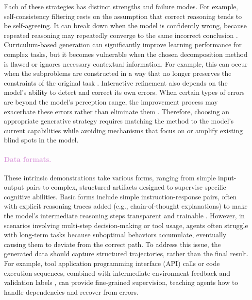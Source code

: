 Each of these strategies has distinct strengths and failure modes. For example, self-consistency filtering rests on the assumption that correct reasoning tends to be self-agreeing. It can break down when the model is confidently wrong, because repeated reasoning may repeatedly converge to the same incorrect conclusion \citep{chen2024failuresselfconsistencymultistepreasoning, anonymous2025complementing}. 
Curriculum-based generation can significantly improve learning performance for complex tasks, but it becomes vulnerable when the chosen decomposition method is flawed or ignores necessary contextual information. For example, this can occur when the subproblems are constructed in a way that no longer preserves the constraints of the original task \citep{zhou2023leasttomost, xu2024wizardlm}.
Interactive refinement also depends on the model's ability to detect and correct its own errors. When certain types of errors are beyond the model's perception range, the improvement process may exacerbate these errors rather than eliminate them \citep{shinn2023reflexionlanguageagentsverbal, huang2024largelanguagemodelsselfcorrect}. Therefore, choosing an appropriate generative strategy requires matching the method to the model's current capabilities while avoiding mechanisms that focus on or amplify existing blind spots in the model.


\paragraph{\textcolor{Plum}{Data formats.}} These intrinsic demonstrations take various forms, ranging from simple input-output pairs to complex, structured artifacts designed to supervise specific cognitive abilities. Basic forms include simple instruction-response pairs, often with explicit reasoning traces added (e.g., chain-of-thought explanations) to make the model's intermediate reasoning steps transparent and trainable \citep{huang2023large}. 
However, in scenarios involving multi-step decision-making or tool usage, agents often struggle with long-term tasks because suboptimal behaviors accumulate, eventually causing them to deviate from the correct path. To address this issue, the generated data should capture structured trajectories, rather than the final result. For example, tool application programming interface (API) calls or code execution sequences, combined with intermediate environment feedback and validation labels \citep{shi2025taskcraft, singh2023beyond}, can provide fine-grained supervision, teaching agents how to handle dependencies and recover from errors.


